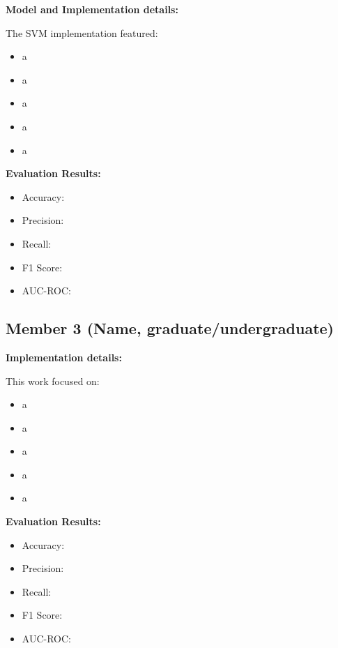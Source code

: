 \documentclass[11pt,a4paper]{article}
\begin{document}
\begin{tcolorbox}[
        title=Support Vector Machine Implementation,
        colback=lightpurple!30,
        colframe=mediumpurple,
        boxrule=0.5pt,
        fonttitle=\bfseries\sffamily\footnotesize,
        fontupper=\footnotesize
    ]
    \textbf{Model and Implementation details:}

    The SVM implementation featured:
    \begin{itemize}[leftmargin=*, itemsep=2pt, parsep=0pt]
        \item a
        \item a
        \item a
        \item a
        \item a
    \end{itemize}

    \textbf{Evaluation Results:}
    \begin{itemize}[leftmargin=*, itemsep=2pt, parsep=0pt]
        \item Accuracy:
        \item Precision:
        \item Recall:
        \item F1 Score:
        \item AUC-ROC:
    \end{itemize}
\end{tcolorbox}

\subsection{Member 3 (Name, graduate/undergraduate)}

\begin{tcolorbox}[
        title=Data Preprocessing and Feature Engineering,
        colback=lightgreen!30,
        colframe=darkgreen,
        boxrule=0.5pt,
        fonttitle=\bfseries\sffamily\footnotesize,
        fontupper=\footnotesize
    ]
    \textbf{Implementation details:}

    This work focused on:
    \begin{itemize}[leftmargin=*, itemsep=2pt, parsep=0pt]
        \item a
        \item a
        \item a
        \item a
        \item a
    \end{itemize}

    \textbf{Evaluation Results:}
    \begin{itemize}[leftmargin=*, itemsep=2pt, parsep=0pt]
        \item Accuracy:
        \item Precision:
        \item Recall:
        \item F1 Score:
        \item AUC-ROC:
    \end{itemize}
\end{tcolorbox}
\end{document}
